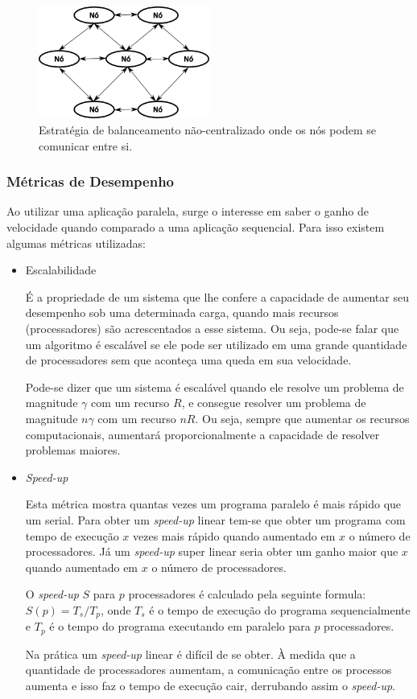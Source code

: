  \begin{figure}[htbp]
     \centering
     \includegraphics[width=0.5\textwidth]{fig/pulling.png}
     \caption{Estratégia de balanceamento não-centralizado onde os nós podem se comunicar entre si.} 
     \label{fig:pulling}
 \end{figure}

\subsubsection{Métricas de Desempenho}\label{Metricas de desempenho}

Ao utilizar uma aplicação paralela, surge o interesse em saber o ganho de velocidade quando comparado a uma aplicação sequencial. Para isso existem algumas métricas utilizadas:

\begin{itemize}
 \item Escalabilidade

 É a propriedade de um sistema que lhe confere a capacidade de aumentar seu desempenho sob uma determinada carga, quando mais recursos (processadores) são acrescentados a esse sistema. Ou seja, pode-se falar que um algoritmo é escalável se ele pode ser utilizado em uma grande quantidade de processadores sem que aconteça uma queda em sua velocidade.
 
 Pode-se dizer que um sistema é escalável quando ele resolve um problema de magnitude $\gamma$ com um recurso $R$, e consegue resolver um problema de magnitude $n\gamma$ com um recurso $nR$. Ou seja, sempre que aumentar os recursos computacionais, aumentará proporcionalmente a capacidade de resolver problemas maiores.
 
 \item \textit{Speed-up}

  Esta métrica mostra quantas vezes um programa paralelo é mais rápido que um serial. Para obter um \textit{speed-up} linear tem-se que obter um programa com tempo de execução $x$ vezes mais rápido quando aumentado em $x$ o número de processadores. Já um \textit{speed-up} super linear seria obter um ganho maior que $x$ quando aumentado em $x$ o número de processadores.
 
 O \textit{speed-up} $S$ para $p$ processadores é calculado pela seguinte formula: $ S(p) = T_s / T_p $, onde $T_s$ é o tempo de execução do programa sequencialmente e $T_p$ é o tempo do programa executando em paralelo para $p$ processadores.
 
 Na prática um \textit{speed-up} linear é difícil de se obter. À medida que a quantidade de processadores aumentam, a comunicação entre os processos aumenta e isso faz o tempo de execução cair, derrubando assim o \textit{speed-up}.
 
\end{itemize}


